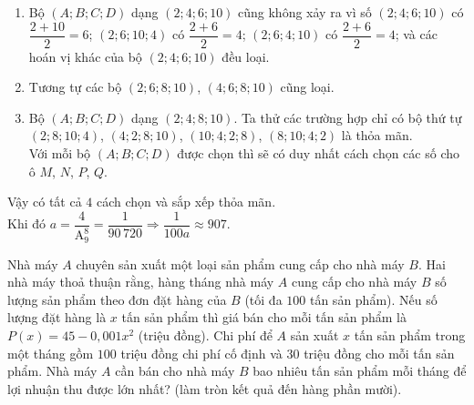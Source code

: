\begin{ex}
{\begin{enumerate}[TH 1.]
\begin{enumerate}[TH i.]
		\item Bộ $(A;B;C;D)$ dạng $(2;4;6;10)$ cũng không xảy ra vì số $(2;4;6;10)$ có $\dfrac{2+10}{2}=6$;  $(2;6;10;4)$ có $\dfrac{2+6}{2}=4$;  $(2;6;4;10)$ có $\dfrac{2+6}{2}=4$; và các hoán vị khác của bộ $(2;4;6;10)$ đều loại.
 		\item Tương tự các bộ $(2;6;8;10)$, $(4;6;8;10)$ cũng loại.
 		\item Bộ $(A;B;C;D)$ dạng $(2;4;8;10)$. Ta thử các trường hợp chỉ có bộ thứ tự $(2;8;10;4)$, $(4;2;8;10)$, $(10;4;2;8)$, $(8;10;4;2)$ là thỏa mãn.\\
 		Với mỗi bộ $(A;B;C;D)$ được chọn thì sẽ có duy nhất cách chọn các số cho ô $M$, $N$, $P$, $Q$.
	\end{enumerate}
	\end{enumerate}
	Vậy có tất cả $4$ cách chọn và sắp xếp thỏa mãn.\\
		Khi đó $a=\dfrac{4}{\mathrm{A}_9^8}=\dfrac{1}{90\,720} \Rightarrow \dfrac{1}{100a}\approx 907$.
}
\end{ex}

\begin{ex}%
	Nhà máy $A$ chuyên sản xuất một loại sản phẩm cung cấp cho nhà máy $B$. Hai nhà máy thoả thuận rằng, hàng tháng nhà máy $A$ cung cấp cho nhà máy $B$ số lượng sản phẩm theo đơn đặt hàng của $B$ (tối đa $100$ tấn sản phẩm). Nếu số lượng đặt hàng là $x$ tấn sản phẩm thì giá bán cho mỗi tấn sản phẩm là $P(x)=45-0{,}001 x^2$ (triệu đồng). Chi phí để $A$ sản xuất $x$ tấn sản phẩm trong một tháng gồm $100$ triệu đồng chi phí cố định và $30$ triệu đồng cho mỗi tấn sản phẩm. Nhà máy $A$ cần bán cho nhà máy $B$ bao nhiêu tấn sản phẩm mỗi tháng để lợi nhuận thu được lớn nhất? (làm tròn kết quả đến hàng phần mười).
\end{ex}

